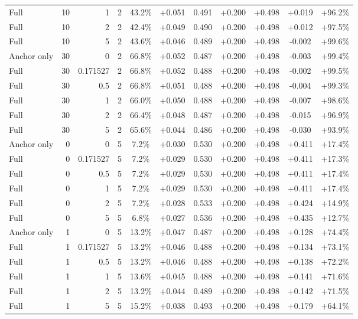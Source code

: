 \begin{table}[htbp]
\begin{tabular}{lrrrccccccc}
Full & 10 & 1 & 2 & 43.2\% & +0.051 & 0.491 & +0.200 & +0.498 & +0.019 & +96.2\% \\
Full & 10 & 2 & 2 & 42.4\% & +0.049 & 0.490 & +0.200 & +0.498 & +0.012 & +97.5\% \\
Full & 10 & 5 & 2 & 43.6\% & +0.046 & 0.489 & +0.200 & +0.498 & -0.002 & +99.6\% \\
Anchor only & 30 & 0 & 2 & 66.8\% & +0.052 & 0.487 & +0.200 & +0.498 & -0.003 & +99.4\% \\
Full & 30 & 0.171527 & 2 & 66.8\% & +0.052 & 0.488 & +0.200 & +0.498 & -0.002 & +99.5\% \\
Full & 30 & 0.5 & 2 & 66.8\% & +0.051 & 0.488 & +0.200 & +0.498 & -0.004 & +99.3\% \\
Full & 30 & 1 & 2 & 66.0\% & +0.050 & 0.488 & +0.200 & +0.498 & -0.007 & +98.6\% \\
Full & 30 & 2 & 2 & 66.4\% & +0.048 & 0.487 & +0.200 & +0.498 & -0.015 & +96.9\% \\
Full & 30 & 5 & 2 & 65.6\% & +0.044 & 0.486 & +0.200 & +0.498 & -0.030 & +93.9\% \\
Anchor only & 0 & 0 & 5 & 7.2\% & +0.030 & 0.530 & +0.200 & +0.498 & +0.411 & +17.4\% \\
Full & 0 & 0.171527 & 5 & 7.2\% & +0.029 & 0.530 & +0.200 & +0.498 & +0.411 & +17.3\% \\
Full & 0 & 0.5 & 5 & 7.2\% & +0.029 & 0.530 & +0.200 & +0.498 & +0.411 & +17.4\% \\
Full & 0 & 1 & 5 & 7.2\% & +0.029 & 0.530 & +0.200 & +0.498 & +0.411 & +17.4\% \\
Full & 0 & 2 & 5 & 7.2\% & +0.028 & 0.533 & +0.200 & +0.498 & +0.424 & +14.9\% \\
Full & 0 & 5 & 5 & 6.8\% & +0.027 & 0.536 & +0.200 & +0.498 & +0.435 & +12.7\% \\
Anchor only & 1 & 0 & 5 & 13.2\% & +0.047 & 0.487 & +0.200 & +0.498 & +0.128 & +74.4\% \\
Full & 1 & 0.171527 & 5 & 13.2\% & +0.046 & 0.488 & +0.200 & +0.498 & +0.134 & +73.1\% \\
Full & 1 & 0.5 & 5 & 13.2\% & +0.046 & 0.488 & +0.200 & +0.498 & +0.138 & +72.2\% \\
Full & 1 & 1 & 5 & 13.6\% & +0.045 & 0.488 & +0.200 & +0.498 & +0.141 & +71.6\% \\
Full & 1 & 2 & 5 & 13.2\% & +0.044 & 0.489 & +0.200 & +0.498 & +0.142 & +71.5\% \\
Full & 1 & 5 & 5 & 15.2\% & +0.038 & 0.493 & +0.200 & +0.498 & +0.179 & +64.1\% \\

\end{tabular}
\end{table}
